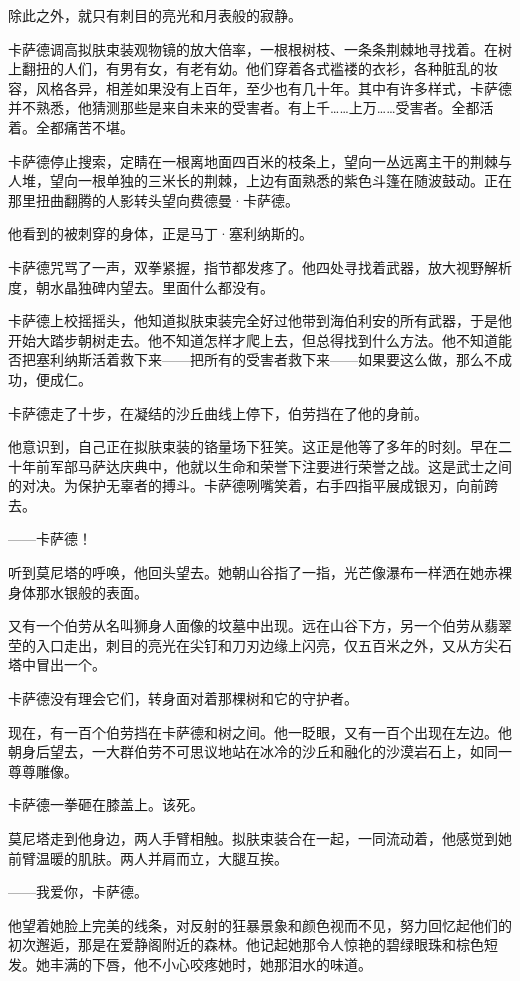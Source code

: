 \documentclass[AutoFakeBold=true]{book}
\begin{document}
除此之外，就只有刺目的亮光和月表般的寂静。

卡萨德调高拟肤束装观物镜的放大倍率，一根根树枝、一条条荆棘地寻找着。在树上翻扭的人们，有男有女，有老有幼。他们穿着各式褴褛的衣衫，各种脏乱的妆容，风格各异，相差如果没有上百年，至少也有几十年。其中有许多样式，卡萨德并不熟悉，他猜测那些是来自未来的受害者。有上千……上万……受害者。全都活着。全都痛苦不堪。

卡萨德停止搜索，定睛在一根离地面四百米的枝条上，望向一丛远离主干的荆棘与人堆，望向一根单独的三米长的荆棘，上边有面熟悉的紫色斗篷在随波鼓动。正在那里扭曲翻腾的人影转头望向费德曼·卡萨德。

他看到的被刺穿的身体，正是马丁·塞利纳斯的。

卡萨德咒骂了一声，双拳紧握，指节都发疼了。他四处寻找着武器，放大视野解析度，朝水晶独碑内望去。里面什么都没有。

卡萨德上校摇摇头，他知道拟肤束装完全好过他带到海伯利安的所有武器，于是他开始大踏步朝树走去。他不知道怎样才爬上去，但总得找到什么方法。他不知道能否把塞利纳斯活着救下来——把所有的受害者救下来——如果要这么做，那么不成功，便成仁。

卡萨德走了十步，在凝结的沙丘曲线上停下，伯劳挡在了他的身前。

他意识到，自己正在拟肤束装的铬量场下狂笑。这正是他等了多年的时刻。早在二十年前军部马萨达庆典中，他就以生命和荣誉下注要进行荣誉之战。这是武士之间的对决。为保护无辜者的搏斗。卡萨德咧嘴笑着，右手四指平展成银刃，向前跨去。

{\kaishu ——卡萨德！}

听到莫尼塔的呼唤，他回头望去。她朝山谷指了一指，光芒像瀑布一样洒在她赤裸身体那水银般的表面。

又有一个伯劳从名叫狮身人面像的坟墓中出现。远在山谷下方，另一个伯劳从翡翠茔的入口走出，刺目的亮光在尖钉和刀刃边缘上闪亮，仅五百米之外，又从方尖石塔中冒出一个。

卡萨德没有理会它们，转身面对着那棵树和它的守护者。

现在，有一百个伯劳挡在卡萨德和树之间。他一眨眼，又有一百个出现在左边。他朝身后望去，一大群伯劳不可思议地站在冰冷的沙丘和融化的沙漠岩石上，如同一尊尊雕像。

卡萨德一拳砸在膝盖上。{\kaishu 该死。}

莫尼塔走到他身边，两人手臂相触。拟肤束装合在一起，一同流动着，他感觉到她前臂温暖的肌肤。两人并肩而立，大腿互挨。

{\kaishu ——我爱你，卡萨德。}

他望着她脸上完美的线条，对反射的狂暴景象和颜色视而不见，努力回忆起他们的初次邂逅，那是在爱静阁附近的森林。他记起她那令人惊艳的碧绿眼珠和棕色短发。她丰满的下唇，他不小心咬疼她时，她那泪水的味道。
\end{document}
